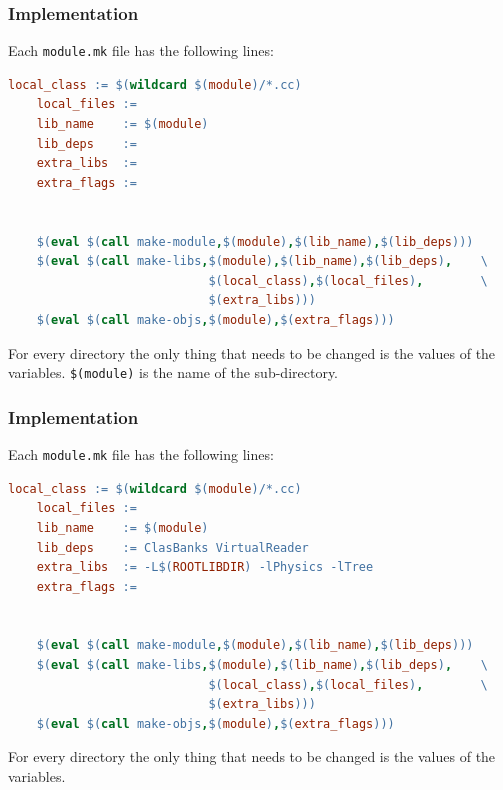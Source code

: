 \documentclass[11pt]{beamer}
\begin{document}

\lstset{%
     showstringspaces = false,
     basicstyle=\scriptsize\ttfamily,
   }

\begin{frame}[fragile]
  \frametitle{Implementation}
  Each \texttt{module.mk} file has the following lines:

  \begin{lstlisting}[language=make]
    local_class := $(wildcard $(module)/*.cc)
    local_files :=
    lib_name    := $(module)
    lib_deps    :=
    extra_libs  :=
    extra_flags :=


    $(eval $(call make-module,$(module),$(lib_name),$(lib_deps)))
    $(eval $(call make-libs,$(module),$(lib_name),$(lib_deps),    \
                            $(local_class),$(local_files),        \
                            $(extra_libs)))
    $(eval $(call make-objs,$(module),$(extra_flags)))
  \end{lstlisting}

  \pause
  For every directory the only thing that needs to be changed is the values of
  the variables. \texttt{\$(module)} is the name of the sub-directory.
\end{frame}


\begin{frame}[fragile]
  \frametitle{Implementation}
  Each \texttt{module.mk} file has the following lines:

  \begin{lstlisting}[language=make]
    local_class := $(wildcard $(module)/*.cc)
    local_files :=
    lib_name    := $(module)
    lib_deps    := ClasBanks VirtualReader
    extra_libs  := -L$(ROOTLIBDIR) -lPhysics -lTree
    extra_flags := 


    $(eval $(call make-module,$(module),$(lib_name),$(lib_deps)))
    $(eval $(call make-libs,$(module),$(lib_name),$(lib_deps),    \
                            $(local_class),$(local_files),        \
                            $(extra_libs)))
    $(eval $(call make-objs,$(module),$(extra_flags)))
  \end{lstlisting}

  For every directory the only thing that needs to be changed is the values of
  the variables.
\end{frame}

\end{document}
